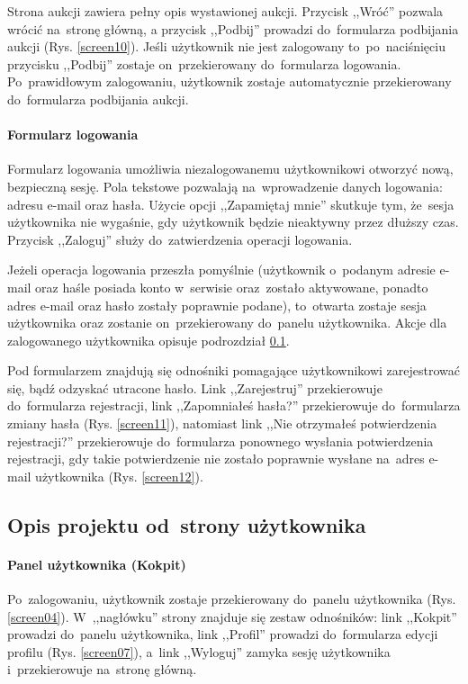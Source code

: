 Strona aukcji zawiera pełny opis wystawionej aukcji. Przycisk ,,Wróć'' pozwala wrócić na~stronę główną, a przycisk ,,Podbij'' prowadzi do~formularza podbijania aukcji (Rys. \ref{screen10}). Jeśli użytkownik nie jest zalogowany to~po~naciśnięciu przycisku ,,Podbij'' zostaje on~przekierowany do~formularza logowania. Po~prawidłowym zalogowaniu, użytkownik zostaje automatycznie przekierowany do~formularza podbijania aukcji.

\paragraph{Formularz logowania}

Formularz logowania umożliwia niezalogowanemu użytkownikowi otworzyć nową, bezpieczną sesję. Pola tekstowe pozwalają na~wprowadzenie danych logowania: adresu e-mail oraz hasła. Użycie opcji ,,Zapamiętaj mnie'' skutkuje tym, że~sesja użytkownika nie wygaśnie, gdy użytkownik będzie nieaktywny przez dłuższy czas. Przycisk ,,Zaloguj'' służy do~zatwierdzenia operacji logowania.


Jeżeli operacja logowania przeszła pomyślnie (użytkownik o~podanym adresie e-mail oraz haśle posiada konto w~serwisie oraz~zostało aktywowane, ponadto adres e-mail oraz hasło zostały poprawnie podane), to~otwarta zostaje sesja użytkownika oraz zostanie on~przekierowany do~panelu użytkownika. Akcje dla zalogowanego użytkownika opisuje podrozdział \ref{man.user}.

Pod formularzem znajdują się odnośniki pomagające użytkownikowi zarejestrować się, bądź odzyskać utracone hasło. Link ,,Zarejestruj'' przekierowuje do~formularza rejestracji, link ,,Zapomniałeś hasła?'' przekierowuje do~formularza zmiany hasła (Rys. \ref{screen11}), natomiast link ,,Nie otrzymałeś potwierdzenia rejestracji?'' przekierowuje do~formularza ponownego wysłania potwierdzenia rejestracji, gdy takie potwierdzenie nie zostało poprawnie wysłane na~adres e-mail użytkownika (Rys. \ref{screen12}).

\subsection{Opis projektu od~strony użytkownika} \label{man.user}

\paragraph{Panel użytkownika (Kokpit)}

Po~zalogowaniu, użytkownik zostaje przekierowany do~panelu użytkownika (Rys. \ref{screen04}). W~,,nagłówku'' strony znajduje się zestaw odnośników: link ,,Kokpit'' prowadzi do~panelu użytkownika, link ,,Profil'' prowadzi do~formularza edycji profilu (Rys. \ref{screen07}), a~link ,,Wyloguj'' zamyka sesję użytkownika i~przekierowuje na~stronę główną.


